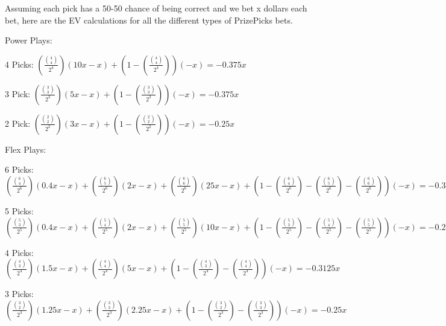 Assuming each pick has a 50-50 chance of being correct and we bet x dollars each bet, here are the EV calculations for all the different types of PrizePicks bets.

Power Plays:

4 Picks: $\left(\frac{\binom{4}{4}}{2^4}\right)(10x-x)+\left(1-\left(\frac{\binom{4}{4}}{2^4}\right)\right)(-x)=-0.375x$

3 Pick: $\left(\frac{\binom{3}{3}}{2^3}\right)(5x-x)+\left(1-\left(\frac{\binom{3}{3}}{2^3}\right)\right)(-x)=-0.375x$

2 Pick: $\left(\frac{\binom{2}{2}}{2^2}\right)(3x-x)+\left(1-\left(\frac{\binom{2}{2}}{2^2}\right)\right)(-x)=-0.25x$

Flex Plays:

6 Picks: $\left(\frac{\binom{6}{4}}{2^6}\right)(0.4x-x)+\left(\frac{\binom{6}{5}}{2^6}\right)(2x-x)+\left(\frac{\binom{6}{6}}{2^6}\right)(25x-x)+\left(1-\left(\frac{\binom{6}{4}}{2^6}\right)-\left(\frac{\binom{6}{5}}{2^6}\right)-\left(\frac{\binom{6}{6}}{2^6}\right)\right)(-x)=-0.328125x$

5 Picks: $\left(\frac{\binom{5}{3}}{2^5}\right)(0.4x-x)+\left(\frac{\binom{5}{4}}{2^5}\right)(2x-x)+\left(\frac{\binom{5}{5}}{2^5}\right)(10x-x)+\left(1-\left(\frac{\binom{5}{3}}{2^5}\right)-\left(\frac{\binom{5}{4}}{2^5}\right)-\left(\frac{\binom{5}{5}}{2^5}\right)\right)(-x)=-0.25x$

4 Picks: $\left(\frac{\binom{4}{3}}{2^4}\right)(1.5x-x)+\left(\frac{\binom{4}{4}}{2^4}\right)(5x-x)+\left(1-\left(\frac{\binom{4}{3}}{2^4}\right)-\left(\frac{\binom{4}{4}}{2^4}\right)\right)(-x)=-0.3125x$

3 Picks: $\left(\frac{\binom{3}{2}}{2^3}\right)(1.25x-x)+\left(\frac{\binom{3}{3}}{2^3}\right)(2.25x-x)+\left(1-\left(\frac{\binom{3}{2}}{2^3}\right)-\left(\frac{\binom{3}{3}}{2^3}\right)\right)(-x)=-0.25x$
